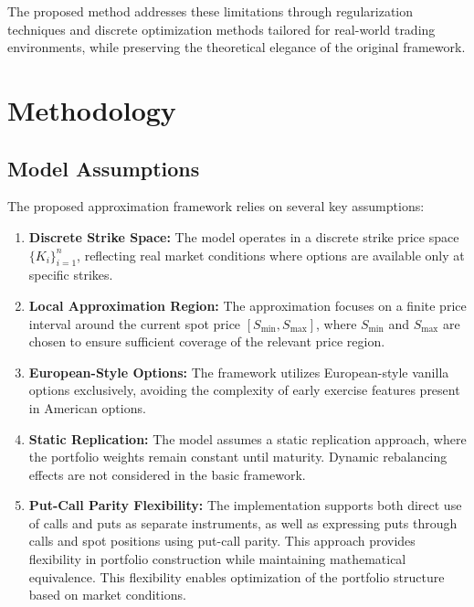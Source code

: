\documentclass[12pt]{article}
\begin{document}
The proposed method addresses these limitations through regularization techniques and 
discrete optimization methods tailored for real-world trading environments, while 
preserving the theoretical elegance of the original framework.

\section{Methodology}
\subsection{Model Assumptions}
The proposed approximation framework relies on several key assumptions:

\begin{enumerate}
    \item \textbf{Discrete Strike Space:} The model operates in a discrete strike price space 
    $\{K_i\}_{i=1}^n$, reflecting real market conditions where options are available only 
    at specific strikes.
    
    \item \textbf{Local Approximation Region:} The approximation focuses on a finite price 
    interval around the current spot price $[S_{\min}, S_{\max}]$, where $S_{\min}$ and $S_{\max}$ 
    are chosen to ensure sufficient coverage of the relevant price region.
    
    \item \textbf{European-Style Options:} The framework utilizes European-style vanilla 
    options exclusively, avoiding the complexity of early exercise features present in 
    American options.
    
    \item \textbf{Static Replication:} The model assumes a static replication approach, 
    where the portfolio weights remain constant until maturity. Dynamic rebalancing effects 
    are not considered in the basic framework.
    
    \item \textbf{Put-Call Parity Flexibility:} The implementation supports both direct 
    use of calls and puts as separate instruments, as well as expressing puts through 
    calls and spot positions using put-call parity. This approach provides flexibility 
    in portfolio construction while maintaining mathematical equivalence.
    This flexibility enables optimization of the portfolio structure based on market 
    conditions.
\end{enumerate}
\end{document}
